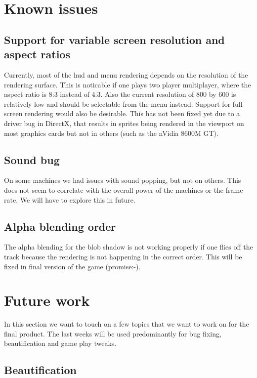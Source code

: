\documentclass[11pt]{article}
\begin{document}
\section{Known issues}
\label{known-issues}


\subsection{Support for variable screen resolution and aspect ratios}

Currently, most of the hud and menu rendering depends on the resolution of the rendering surface. This is noticable if one plays two player multiplayer, where the aspect ratio is 8:3 instead of 4:3. Also the current resolution of 800 by 600 is relatively low and should be selectable from the menu instead. Support for full screen rendering would also be desirable.
This has not been fixed yet due to a driver bug in DirectX, that results in sprites being rendered in the viewport on most graphics cards but not in others (such as the nVidia 8600M GT). 

\subsection{Sound bug}

On some machines we had issues with sound popping, but not on others. This does not seem to correlate with the overall power of the machines or the frame rate. We will have to explore this in future. 

\subsection{Alpha blending order}

The alpha blending for the blob shadow is not working properly if one flies off the track because the rendering is not happening in the correct order. This will be fixed in final version of the game (promise:-).

\section{Future work}
\label{future-work}

In this section we want to touch on a few topics that we want to work on for the final product. The last weeks will be used predominantly for bug fixing, beautification and game play tweaks.

\subsection{Beautification}
\end{document}
